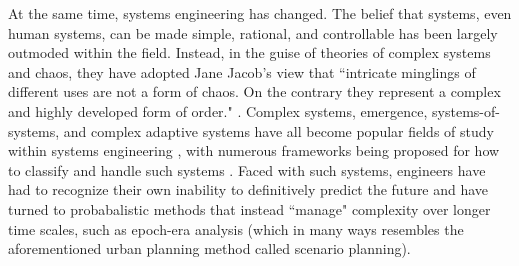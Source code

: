 \documentclass[notitlepage]{article}
\begin{document}
At the same time, systems engineering has changed. The belief that systems, even human systems, can be made simple, rational, and controllable has been largely outmoded within the field. Instead, in the guise of theories of complex systems and chaos, they have adopted Jane Jacob's view that ``intricate minglings of different uses are not a form of chaos. On the contrary they represent a complex and highly developed form of order." \cite{jacobsDeathLifeGreat2016}. Complex systems, emergence, systems-of-systems, and complex adaptive systems have all become popular fields of study within systems engineering \cite{mcdermidComplexityConceptCauses2000,sussmanTeachingComplexSociotechnical2010, chenComplexityEmergenceEngineering2009,deguetElementsEmergenceIssue2006,
officeofthedirectorofsystemsandsoftwareengineeringSystemsEngineeringGuide2008,glassComplexAdaptiveSystems2011,
incosecomplexsystemsworkinggroupComplexityPrimerSystems2016,bradleyComplexSystemGovernance2016,
mittalHumanLoopSystem2015,sheardPracticalApplicationsComplexity2005}, with numerous frameworks being proposed for how to classify and handle such systems \cite{kurtzNewDynamicsStrategy2003,martinFrameworkQuantifyingComplexity2004, sheardComplexityTypologySystems2010, righiCharacterizingComplexitySociotechnical2012,schottlQuantifyingComplexitySocioTechnical2015, reymondetFrameworkSenseMakingComplex2016}. Faced with such systems, engineers have had to recognize their own inability to definitively predict the future and have turned to probabalistic methods that instead ``manage" complexity over longer time scales, such as epoch-era analysis \cite{rossUsingNaturalValueCentric2008,vascikMethodExploringProgram2015} (which in many ways resembles the aforementioned urban planning method called scenario planning).
\end{document}
